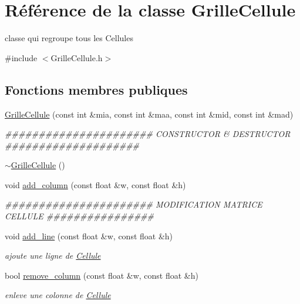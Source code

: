 \hypertarget{classGrilleCellule}{
\section{Référence de la classe GrilleCellule}
\label{classGrilleCellule}
}


classe qui regroupe tous les Cellules  




{\ttfamily \#include $<$GrilleCellule.h$>$}

\subsection*{Fonctions membres publiques}
\begin{DoxyCompactItemize}
\item 
\hyperlink{classGrilleCellule_ab0f82ebfe93980602c60f76f48ac296d}{GrilleCellule} (const int \&mia, const int \&maa, const int \&mid, const int \&mad)
\begin{DoxyCompactList}\small\item\em \#\#\#\#\#\#\#\#\#\#\#\#\#\#\#\#\#\#\#\#\#\# CONSTRUCTOR \& DESTRUCTOR \#\#\#\#\#\#\#\#\#\#\#\#\#\#\#\#\#\#\#\# \end{DoxyCompactList}\item 
\hyperlink{classGrilleCellule_aa88e67db66028855df7f5e3e9f21ec0a}{$\sim$GrilleCellule} ()
\item 
void \hyperlink{classGrilleCellule_a06b8bd8cf9e17b820332c6e996de33dd}{add\_\-column} (const float \&w, const float \&h)
\begin{DoxyCompactList}\small\item\em \#\#\#\#\#\#\#\#\#\#\#\#\#\#\#\#\#\#\#\#\#\# MODIFICATION MATRICE CELLULE \#\#\#\#\#\#\#\#\#\#\#\#\#\#\#\# \end{DoxyCompactList}\item 
void \hyperlink{classGrilleCellule_a223464b2d5924b9b058a465c1e9cd352}{add\_\-line} (const float \&w, const float \&h)
\begin{DoxyCompactList}\small\item\em ajoute une ligne de \hyperlink{classCellule}{Cellule} \end{DoxyCompactList}\item 
bool \hyperlink{classGrilleCellule_ab20e4b964f7efe4982b96122477c9757}{remove\_\-column} (const float \&w, const float \&h)
\begin{DoxyCompactList}\small\item\em enleve une colonne de \hyperlink{classCellule}{Cellule} \end{DoxyCompactList}\item 

\end{DoxyCompactItemize}
